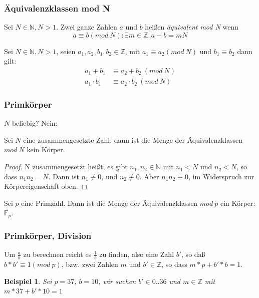 \documentclass{beamer}
\newcommand{\F}{\mathbb{F}}
\newcommand{\N}{\mathbb{N}}
\newcommand{\Z}{\mathbb{Z}}
\newtheorem{beispiel}[theorem]{Beispiel}
\begin{document}
\begin{frame}
  \frametitle{Äquivalenzklassen mod N}
  \begin{definition}
    Sei $N \in \N, N > 1$. Zwei ganze Zahlen $a$ und $b$ heißen
    \emph{äquivalent mod N} wenn
    $$ a \equiv b (mod\ N): \exists m \in \Z: a-b = mN $$
  \end{definition}

  \begin{lemma}
    Sei $N \in \N, N > 1$, seien $a_1, a_2, b_1, b_2 \in \Z$,
    mit $a_1 \equiv a_2 (mod\ N)$ und $b_1 \equiv b_2$  dann gilt:
    \begin{equation}
      \begin{split}
        \label{op:mod}
        a_1 + b_1 & \equiv  a_2 + b_2 \ (mod\ N) \\
        a_1 \cdot b_1 & \equiv  a_2 \cdot b_2 \ (mod\ N)
      \end{split}
    \end{equation}
  \end{lemma}
\end{frame}

\begin{frame}
  \frametitle{Primkörper}

  $N$ beliebig? Nein:

  \begin{lemma}
  Sei $N$ eine zusammengesetzte Zahl, dann ist die Menge der
  Äquivalenzklassen $mod\ N$ kein Körper.
  \end{lemma}
  \begin{proof}
    N zusammengesetzt heißt, es gibt $n_1, n_2 \in \N$ mit $n_1 < N$
    und $n_2 < N$, so dass $n_1 n_2 = N$. Dann ist $n_1 \not\equiv 0$, und
    $n_2 \not\equiv 0$. Aber $n_1 n_2 \equiv 0$, im Widerspruch zur
    Körpereigenschaft oben.
  \end{proof}
  \begin{theorem}
    Sei $p$ eine Primzahl. Dann ist die Menge der Äquivalenzklassen $mod\ p$
    ein Körper: $\F_p$.
  \end{theorem}
\end{frame}

\begin{frame}
  \frametitle{Primkörper, Division}
  Um $\frac{a}{b}$ zu berechnen reicht es $\frac 1 b$ zu finden, also eine Zahl
  $b'$, so daß $b * b' \equiv 1 (mod\ p)$, bzw. zwei Zahlen $m$ und $b' \in
  \Z$, so dass $m * p + b' * b = 1$.
  \begin{beispiel}
    Sei $p = 37$, $b = 10$, wir suchen $b' \in 0..36$ und
    $m \in \Z$ mit $m * 37 + b' * 10 = 1$
  \end{beispiel}
\end{frame}
\end{document}
